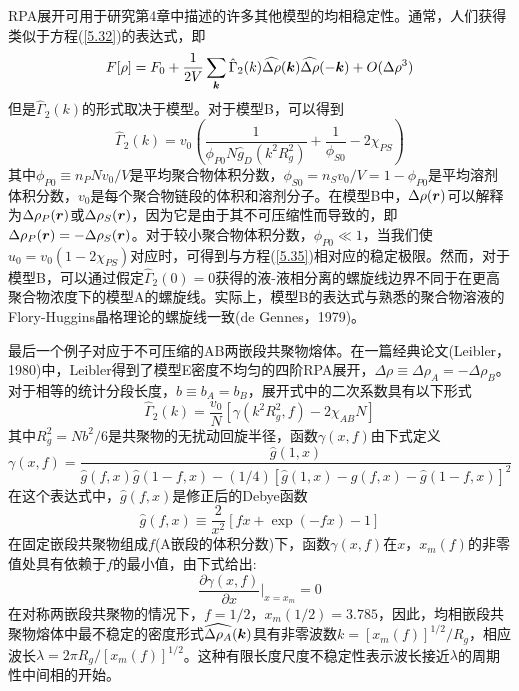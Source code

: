 RPA展开可用于研究第4章中描述的许多其他模型的均相稳定性。通常，人们获得类似于方程(\ref{5.32})的表达式，即
\begin{equation}\label{5.36}
F[\rho]=F_0+\frac{1}{2V}\sum\limits_{\bm{k}}\hat{\Gamma}_2(k)\widehat{\Delta\rho}(\bm{k})\widehat{\Delta\rho}(-\bm{k})+O(\Delta\rho^3)
\end{equation}
但是$\hat{\Gamma}_2(k)$的形式取决于模型。对于模型B，可以得到
\begin{equation}\label{5.37}
\hat{\Gamma}_2(k)=v_0\left(\frac{1}{\phi_{P0}N\hat{g}_D(k^2R_g^2)}+\frac{1}{\phi_{S0}}-2\chi_{PS}\right)
\end{equation}
其中$\phi_{P0}\equiv n_PNv_0/V$是平均聚合物体积分数，$\phi_{S0}=n_Sv_0/V=1-\phi_{P0}$是平均溶剂体积分数，$v_0$是每个聚合物链段的体积和溶剂分子。在模型B中，$\Delta\rho(\bm{r})$可以解释为$\Delta\rho_P(\bm{r})$或$\Delta\rho_S(\bm{r})$，因为它是由于其不可压缩性而导致的，即$\Delta\rho_P(\bm{r})=-\Delta\rho_S(\bm{r})$。对于较小聚合物体积分数，$\phi_{P0}\ll 1$，当我们使$u_0=v_0(1-2\chi_{PS})$对应时，可得到与方程(\ref{5.35})相对应的稳定极限。然而，对于模型B，可以通过假定$\hat{\Gamma}_2(0)=0$获得的液-液相分离的螺旋线边界不同于在更高聚合物浓度下的模型A的螺旋线。实际上，模型B的表达式与熟悉的聚合物溶液的Flory-Huggins晶格理论的螺旋线一致(de Gennes，1979)。

最后一个例子对应于不可压缩的AB两嵌段共聚物熔体。在一篇经典论文(Leibler，1980)中，Leibler得到了模型E密度不均匀的四阶RPA展开，$\Delta\rho\equiv\Delta\rho_A=-\Delta\rho_B$。对于相等的统计分段长度，$b\equiv b_A=b_B$，展开式中的二次系数具有以下形式
\begin{equation}\label{5.38}
\hat{\Gamma}_2(k)=\frac{v_0}{N}\left[\gamma(k^2R_g^2,f)-2\chi_{AB}N\right]
\end{equation}
其中$R_g^2=Nb^2/6$是共聚物的无扰动回旋半径，函数$\gamma(x,f)$由下式定义
\begin{equation}
\gamma(x,f)=\frac{\hat{g}(1,x)}{\hat{g}(f,x)\hat{g}(1-f,x)-(1/4)[\hat{g}(1,x)-\hat{g}(f,x)-\hat{g}(1-f,x)]^2}
\end{equation}
在这个表达式中，$\hat{g}(f,x)$是修正后的Debye函数
\begin{equation}
\hat{g}(f,x)\equiv\frac{2}{x^2}[fx+\exp(-fx)-1]
\end{equation}
在固定嵌段共聚物组成$f$(A嵌段的体积分数)下，函数$\gamma(x,f)$在$x$，$x_m(f)$的非零值处具有依赖于$f$的最小值，由下式给出:
\begin{equation}
\frac{\partial\gamma(x,f)}{\partial x}\bigg|_{x=x_m}=0
\end{equation}
在对称两嵌段共聚物的情况下，$f=1/2$，$x_m(1/2)=3.785$，因此，均相嵌段共聚物熔体中最不稳定的密度形式$\widehat{\Delta\rho_A}(\bm{k})$具有非零波数$k=[x_m(f)]^{1/2}/R_g$，相应波长$\lambda=2\pi R_g/[x_m(f)]^{1/2}$。这种有限长度尺度不稳定性表示波长接近$\lambda$的周期性中间相的开始。

